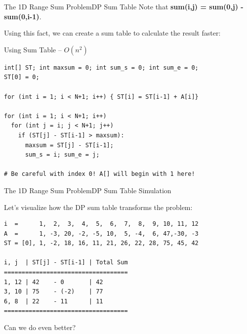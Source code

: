 \begin{frame}[fragile]{The 1D Range Sum Problem}{DP Sum Table}
  Note that {\bf sum(i,j) = sum(0,j) - sum(0,i-1)}.\medskip

  Using this fact, we can create a sum table to calculate the result faster:

  \begin{block}{Using Sum Table -- $O(n^2)$}
{\smaller
\begin{verbatim}
int[] ST; int maxsum = 0; int sum_s = 0; int sum_e = 0;
ST[0] = 0;

for (int i = 1; i < N+1; i++) { ST[i] = ST[i-1] + A[i]}

for (int i = 1; i < N+1; i++)
  for (int j = i; j < N+1; j++)
    if (ST[j] - ST[i-1] > maxsum):
      maxsum = ST[j] - ST[i-1];
      sum_s = i; sum_e = j;

# Be careful with index 0! A[] will begin with 1 here!
\end{verbatim}
}
  \end{block}
\end{frame}

\begin{frame}[fragile]{The 1D Range Sum Problem}{DP Sum Table Simulation}

  Let's visualize how the DP sum table transforms the problem:

{\smaller
\begin{verbatim}
i  =      1,  2,  3,  4,  5,  6,  7,  8,  9, 10, 11, 12
A  =      1, -3, 20, -2, -5, 10,  5, -4,  6, 47,-30, -3
ST = [0], 1, -2, 18, 16, 11, 21, 26, 22, 28, 75, 45, 42

i, j  | ST[j] - ST[i-1] | Total Sum
===================================
1, 12 | 42    - 0       | 42
3, 10 | 75    - (-2)    | 77
6, 8  | 22    - 11      | 11
===================================
\end{verbatim}
}
\bigskip

Can we do even better?
\end{frame}

